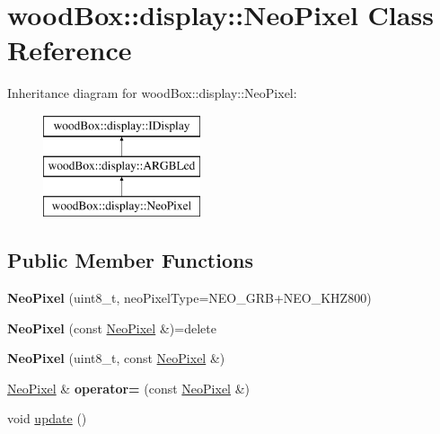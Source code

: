 \hypertarget{classwood_box_1_1display_1_1_neo_pixel}{}\section{wood\+Box\+:\+:display\+:\+:Neo\+Pixel Class Reference}
\label{classwood_box_1_1display_1_1_neo_pixel}
Inheritance diagram for wood\+Box\+:\+:display\+:\+:Neo\+Pixel\+:\begin{figure}[H]
\begin{center}
\leavevmode
\includegraphics[height=3.000000cm]{classwood_box_1_1display_1_1_neo_pixel}
\end{center}
\end{figure}
\subsection*{Public Member Functions}
\begin{DoxyCompactItemize}
\item 
\mbox{\label{classwood_box_1_1display_1_1_neo_pixel_a9ca8f40559e25bb7b4882bbe53764825}} 
{\bfseries Neo\+Pixel} (uint8\+\_\+t, neo\+Pixel\+Type=N\+E\+O\+\_\+\+G\+RB+N\+E\+O\+\_\+\+K\+H\+Z800)
\item 
\mbox{\label{classwood_box_1_1display_1_1_neo_pixel_a2f2e2a778c2d365794daf4c232922035}} 
{\bfseries Neo\+Pixel} (const \mbox{\hyperlink{classwood_box_1_1display_1_1_neo_pixel}{Neo\+Pixel}} \&)=delete
\item 
\mbox{\label{classwood_box_1_1display_1_1_neo_pixel_a82aa2f0f6c13db9b11126a0389e72936}} 
{\bfseries Neo\+Pixel} (uint8\+\_\+t, const \mbox{\hyperlink{classwood_box_1_1display_1_1_neo_pixel}{Neo\+Pixel}} \&)
\item 
\mbox{\label{classwood_box_1_1display_1_1_neo_pixel_a5b187e7ce528d7da80568d627813595d}} 
\mbox{\hyperlink{classwood_box_1_1display_1_1_neo_pixel}{Neo\+Pixel}} \& {\bfseries operator=} (const \mbox{\hyperlink{classwood_box_1_1display_1_1_neo_pixel}{Neo\+Pixel}} \&)
\item 
void \mbox{\hyperlink{classwood_box_1_1display_1_1_neo_pixel_ac2ec48825a10154e0ef99c4d8010aa6e}{update}} ()
\end{DoxyCompactItemize}


